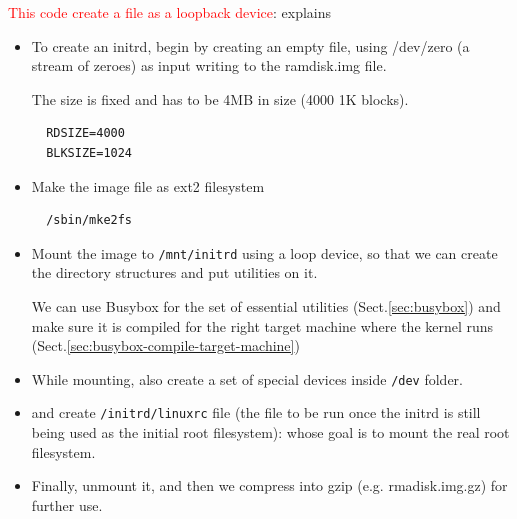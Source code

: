 \textcolor{red}{This code create a file as a loopback device}: explains
\begin{itemize}
  \item  To create an initrd, begin by creating an empty file, using /dev/zero
  (a stream of zeroes) as input writing to the ramdisk.img file.
  
  The size is fixed and has to be  4MB in size (4000 1K blocks).
  \begin{verbatim}
  RDSIZE=4000
  BLKSIZE=1024
  \end{verbatim}
  
  \item Make the image file as ext2 filesystem
  \begin{verbatim}
  /sbin/mke2fs
  \end{verbatim}
  
  \item Mount the image to \verb!/mnt/initrd! using a loop device, so that we
  can create the directory structures and put utilities on it.
  
  We can use Busybox for the set of essential utilities
  (Sect.\ref{sec:busybox}) and
  make sure it is compiled for
  the right target machine where
  the kernel runs (Sect.\ref{sec:busybox-compile-target-machine})
  
  \item While mounting, also create a set of special devices inside \verb!/dev!
  folder.
  
  \item and create \verb!/initrd/linuxrc! file (the file to be run once the
  initrd is still being used as the initial root filesystem): whose goal is to
  mount the real root filesystem.
  
  
  \item Finally, unmount it, and then we compress into gzip (e.g.
  rmadisk.img.gz) for further use.
\end{itemize}

